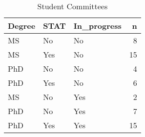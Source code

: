 \begin{table}[h]
\centering
\caption{Student Committees} 
\label{tab:committees}
\begin{tabular}{lllr}
  \hline
Degree & STAT & In\_progress & n \\ 
  \hline
MS & No & No &   8 \\ 
  MS & Yes & No &  15 \\ 
  PhD & No & No &   4 \\ 
  PhD & Yes & No &   6 \\ 
  MS & No & Yes &   2 \\ 
  PhD & No & Yes &   7 \\ 
  PhD & Yes & Yes &  15 \\ 
   \hline
\end{tabular}
\end{table}
